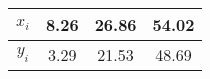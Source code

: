 \begin{tabular}[12pt]{|c|c|c|c|}
    \hline
    $x_i$ & 8.26 & 26.86 & 54.02 \\ 
    \hline
    $y_i$ & 3.29 & 21.53 & 48.69  \\ 
    \hline
\end{tabular}

